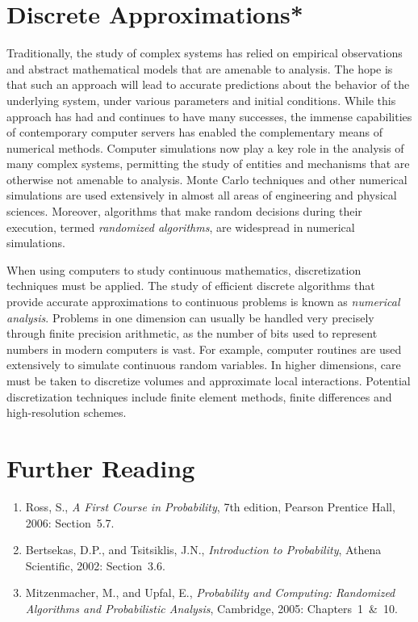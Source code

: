 \section{Discrete Approximations*}

Traditionally, the study of complex systems has relied on empirical observations and abstract mathematical models that are amenable to analysis.
The hope is that such an approach will lead to accurate predictions about the behavior of the underlying system, under various parameters and initial conditions.
While this approach has had and continues to have many successes, the immense capabilities of contemporary computer servers has enabled the complementary means of numerical methods.
Computer simulations now play a key role in the analysis of many complex systems, permitting the study of entities and mechanisms that are otherwise not amenable to analysis.
Monte Carlo techniques and other numerical simulations are used extensively in almost all areas of engineering and physical sciences.
Moreover, algorithms that make random decisions during their execution, termed \emph{randomized algorithms}, are widespread in numerical simulations. 

When using computers to study continuous mathematics, discretization techniques must be applied.
The study of efficient discrete algorithms that provide accurate approximations to continuous problems is known as \emph{numerical analysis}.
Problems in one dimension can usually be handled very precisely through finite precision arithmetic, as the number of bits used to represent numbers in modern computers is vast.
For example, computer routines are used extensively to simulate continuous random variables.
In higher dimensions, care must be taken to discretize volumes and approximate local interactions.
Potential discretization techniques include finite element methods, finite differences and high-resolution schemes.


\section*{Further Reading}

\begin{small}
\begin{enumerate}
\item Ross, S., \emph{A First Course in Probability}, 7th edition, Pearson Prentice Hall, 2006: Section~5.7.
\item Bertsekas, D.P., and Tsitsiklis, J.N., \emph{Introduction to Probability}, Athena Scientific, 2002: Section~3.6.
\item Mitzenmacher, M., and Upfal, E., \emph{Probability and Computing: Randomized Algorithms and Probabilistic Analysis}, Cambridge, 2005: Chapters~1~\&~10.
\end{enumerate}
\end{small}

